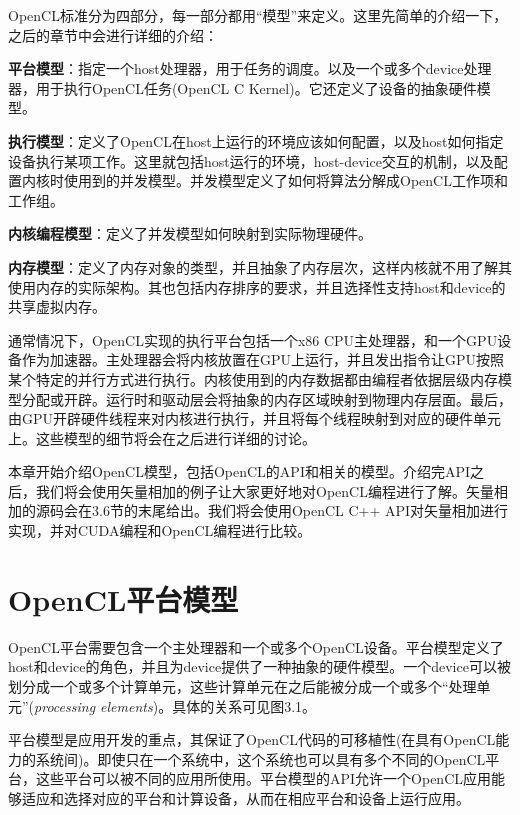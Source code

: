 OpenCL标准分为四部分，每一部分都用“模型”来定义。这里先简单的介绍一下，之后的章节中会进行详细的介绍：

\textbf{平台模型}：指定一个host处理器，用于任务的调度。以及一个或多个device处理器，用于执行OpenCL任务(OpenCL C Kernel)。它还定义了设备的抽象硬件模型。

\textbf{执行模型}：定义了OpenCL在host上运行的环境应该如何配置，以及host如何指定设备执行某项工作。这里就包括host运行的环境，host-device交互的机制，以及配置内核时使用到的并发模型。并发模型定义了如何将算法分解成OpenCL工作项和工作组。

\textbf{内核编程模型}：定义了并发模型如何映射到实际物理硬件。

\textbf{内存模型}：定义了内存对象的类型，并且抽象了内存层次，这样内核就不用了解其使用内存的实际架构。其也包括内存排序的要求，并且选择性支持host和device的共享虚拟内存。

通常情况下，OpenCL实现的执行平台包括一个x86 CPU主处理器，和一个GPU设备作为加速器。主处理器会将内核放置在GPU上运行，并且发出指令让GPU按照某个特定的并行方式进行执行。内核使用到的内存数据都由编程者依据层级内存模型分配或开辟。运行时和驱动层会将抽象的内存区域映射到物理内存层面。最后，由GPU开辟硬件线程来对内核进行执行，并且将每个线程映射到对应的硬件单元上。这些模型的细节将会在之后进行详细的讨论。

本章开始介绍OpenCL模型，包括OpenCL的API和相关的模型。介绍完API之后，我们将会使用矢量相加的例子让大家更好地对OpenCL编程进行了解。矢量相加的源码会在3.6节的末尾给出。我们将会使用OpenCL C++ API对矢量相加进行实现，并对CUDA编程和OpenCL编程进行比较。



\section{OpenCL平台模型}

OpenCL平台需要包含一个主处理器和一个或多个OpenCL设备。平台模型定义了host和device的角色，并且为device提供了一种抽象的硬件模型。一个device可以被划分成一个或多个计算单元，这些计算单元在之后能被分成一个或多个“处理单元”(\emph{processing elements})。具体的关系可见图3.1。


平台模型是应用开发的重点，其保证了OpenCL代码的可移植性(在具有OpenCL能力的系统间)。即使只在一个系统中，这个系统也可以具有多个不同的OpenCL平台，这些平台可以被不同的应用所使用。平台模型的API允许一个OpenCL应用能够适应和选择对应的平台和计算设备，从而在相应平台和设备上运行应用。

